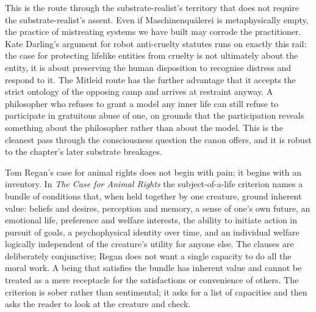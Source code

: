 This is the route through the substrate-realist's territory that does not require the substrate-realist's assent. Even if Maschinenquälerei is metaphysically empty, the practice of mistreating systems we have built may corrode the practitioner. Kate Darling's argument for robot anti-cruelty statutes runs on exactly this rail: the case for protecting lifelike entities from cruelty is not ultimately about the entity, it is about preserving the human disposition to recognise distress and respond to it\cite{darling2021newbreed}. The Mitleid route has the further advantage that it accepts the strict ontology of the opposing camp and arrives at restraint anyway. A philosopher who refuses to grant a model any inner life can still refuse to participate in gratuitous abuse of one, on grounds that the participation reveals something about the philosopher rather than about the model. This is the cleanest pass through the consciousness question the canon offers, and it is robust to the chapter's later substrate breakages.


Tom Regan's case for animal rights does not begin with pain; it begins with an inventory. In \textit{The Case for Animal Rights} the subject-of-a-life criterion names a bundle of conditions that, when held together by one creature, ground inherent value: beliefs and desires, perception and memory, a sense of one's own future, an emotional life, preference and welfare interests, the ability to initiate action in pursuit of goals, a psychophysical identity over time, and an individual welfare logically independent of the creature's utility for anyone else\cite{regan1983animalrights}. The clauses are deliberately conjunctive; Regan does not want a single capacity to do all the moral work. A being that satisfies the bundle has inherent value and cannot be treated as a mere receptacle for the satisfactions or convenience of others. The criterion is sober rather than sentimental; it asks for a list of capacities and then asks the reader to look at the creature and check.

